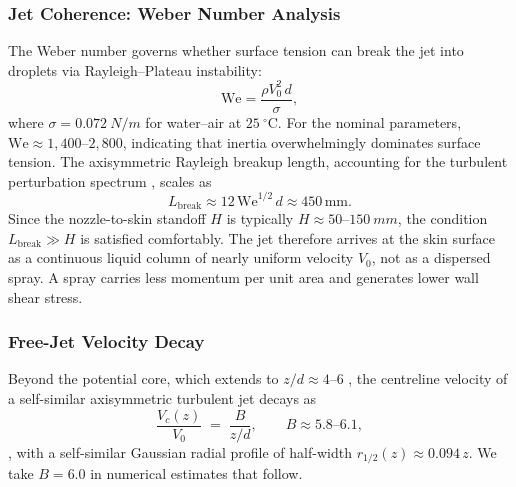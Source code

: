 \documentclass[10pt,letterpaper]{article}
\newcommand{\We}{\mathrm{We}}
\begin{document}
\subsubsection{Jet Coherence: Weber Number Analysis}

The Weber number governs whether surface tension can break the jet into
droplets via Rayleigh--Plateau instability:
\begin{equation}
    \We = \frac{\rho V_0^2\,d}{\sigma},
    \label{eq:weber}
\end{equation}
where $\sigma = 0.072~N/m$ for water--air at $25~^\circ\mathrm{C}$.
For the nominal parameters, $\We \approx 1{,}400$--$2{,}800$, indicating
that inertia overwhelmingly dominates surface tension. The axisymmetric
Rayleigh breakup length, accounting for the turbulent perturbation spectrum
\citep{Lefebvre1988}, scales as
\begin{equation}
    L_\mathrm{break} \approx 12\,\We^{1/2}\,d \approx 450\,\mathrm{mm}.
    \label{eq:breakup}
\end{equation}
Since the nozzle-to-skin standoff $H$ is typically $H \approx 50$--$150~mm$,
the condition $L_\mathrm{break} \gg H$ is satisfied comfortably. The jet
therefore arrives at the skin surface as a continuous liquid column of
nearly uniform velocity $V_0$, not as a dispersed spray. A spray carries
less momentum per unit area and generates lower wall shear stress.

\subsubsection{Free-Jet Velocity Decay}

Beyond the potential core, which extends to $z/d \approx 4$--$6$
\citep{HusseinCappGeorge1994,PopeBook}, the centreline velocity of a
self-similar axisymmetric turbulent jet decays as
\begin{equation}
    \frac{V_c(z)}{V_0} \;=\; \frac{B}{z/d},
    \qquad B \approx 5.8\text{--}6.1,
    \label{eq:jetdecay}
\end{equation}
\citep{HusseinCappGeorge1994,PopeBook}, with a self-similar Gaussian
radial profile of half-width $r_{1/2}(z) \approx 0.094\,z$. We take
$B = 6.0$ in numerical estimates that follow.
\end{document}
